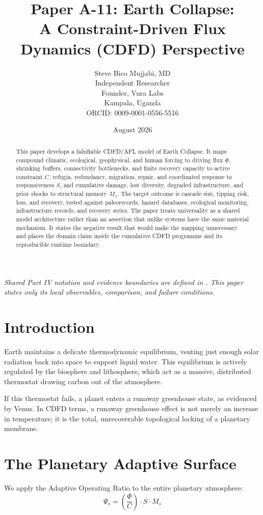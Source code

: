\documentclass[11pt,a4paper]{article}
\title{\textbf{Paper A-11: Earth Collapse:\\ A Constraint-Driven Flux Dynamics (CDFD) Perspective}}
\author{Steve Bico Mujjabi, MD\\
\small Independent Researcher\\
\small Founder, Vura Labs\\
\small Kampala, Uganda\\
\small ORCID: 0009-0001-0556-5516}
\date{August 2026}
\begin{document}
\maketitle

\noindent\textit{Shared Part IV notation and evidence boundaries are defined in . This paper states only its local observables, comparison, and failure conditions.}


\begin{abstract}
This paper develops a falsifiable CDFD/AFL model of Earth Collapse. It maps compound climatic, ecological, geophysical, and human forcing to driving flux $\Phi$, shrinking buffers, connectivity bottlenecks, and finite recovery capacity to active constraint $C$, refugia, redundancy, migration, repair, and coordinated response to responsiveness $S$, and cumulative damage, lost diversity, degraded infrastructure, and prior shocks to structural memory $M_s$. The target outcome is cascade size, tipping risk, loss, and recovery, tested against paleorecords, hazard databases, ecological monitoring, infrastructure records, and recovery series. The paper treats universality as a shared model architecture rather than an assertion that unlike systems have the same material mechanism. It states the negative result that would make the mapping unnecessary and places the domain claim inside the cumulative CDFD programme and its reproducible runtime boundary.
\end{abstract}

\section{Introduction}

Earth maintains a delicate thermodynamic equilibrium, venting just enough solar radiation back into space to support liquid water. This equilibrium is actively regulated by the biosphere and lithosphere, which act as a massive, distributed thermostat drawing carbon out of the atmosphere.

If this thermostat fails, a planet enters a runaway greenhouse state, as evidenced by Venus. In CDFD terms, a runaway greenhouse effect is not merely an increase in temperature; it is the total, unrecoverable topological locking of a planetary membrane.

\section{The Planetary Adaptive Surface}
We apply the Adaptive Operating Ratio to the entire planetary atmosphere:
\begin{equation}
    \Psi_s = \left( \frac{\Phi}{C} \right) \cdot S \cdot M_s
\end{equation}
\end{document}
